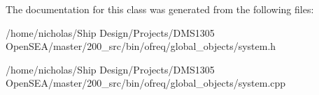 The documentation for this class was generated from the following files\-:\begin{DoxyCompactItemize}
\item 
/home/nicholas/\-Ship Design/\-Projects/\-D\-M\-S1305 Open\-S\-E\-A/master/200\-\_\-src/bin/ofreq/global\-\_\-objects/system.\-h\item 
/home/nicholas/\-Ship Design/\-Projects/\-D\-M\-S1305 Open\-S\-E\-A/master/200\-\_\-src/bin/ofreq/global\-\_\-objects/system.\-cpp\end{DoxyCompactItemize}
